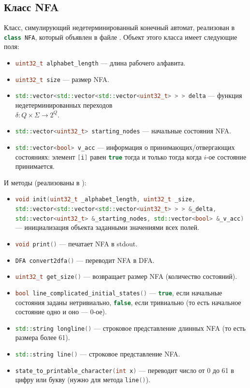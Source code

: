 \documentclass{article}
\begin{document}
\subsection{Класс NFA}
Класс, симулирующий недетерминированный конечный автомат, реализован в \lstinline[language=C++]!class NFA!, который объявлен в файле . Объект этого класса имеет следующие поля:
\begin{itemize}
  \item \lstinline[language=C++]!uint32_t alphabet_length! --- длина рабочего алфавита.
  \item \lstinline[language=C++]!uint32_t size! --- размер NFA.
  \item \lstinline[language=C++]!std::vector<std::vector<std::vector<uint32_t> > > delta! --- функция недетерминированных переходов\\ $\delta: Q \times \Sigma \rightarrow 2^Q$.
  \item \lstinline[language=C++]!std::vector<uint32_t> starting_nodes! --- начальные состояния NFA.
  \item \lstinline[language=C++]!std::vector<bool> v_acc! --- информация о принимающих/отвергающих состояниях: элемент \lstinline[language=C++]![i]! равен \lstinline[language=C++]!true! тогда и только тогда когда $i$-ое состояние принимается.
\end{itemize}
И методы (реализованы в ):
\begin{itemize}
  \item[\ding{228}] \lstinline[language=C++]!void init(uint32_t _alphabet_length, uint32_t _size, std::vector<std::vector<std::vector<uint32_t> > > &_delta, std::vector<uint32_t> &_starting_nodes, std::vector<bool> &_v_acc)! --- инициализация объекта заданными значениями всех полей.
  \item[\ding{228}] \lstinline[language=C++]!void print()! --- печатает NFA в stdout.
  \item[\ding{228}] \lstinline[language=C++]!DFA convert2dfa()! --- переводит NFA в DFA.
  \item[\ding{228}] \lstinline[language=C++]!uint32_t get_size()! --- возвращает размер NFA (количество состояний).
  \item[\ding{228}] \lstinline[language=C++]!bool line_complicated_initial_states()! --- \lstinline[language=C++]!true!, если начальные состояния заданы нетривиально, \lstinline[language=C++]!false!, если тривиально (то есть начальное состояние одно и оно --- 0-ое).
  \item[\ding{228}] \lstinline[language=C++]!std::string longline()! --- строковое представление длинных NFA (то есть размера более 61).
  \item[\ding{228}] \lstinline[language=C++]!std::string line()! --- строковое представление NFA.
  \item[\ding{228}] \lstinline[language=C++]!state_to_printable_character(int x)! --- переводит число от 0 до 61 в цифру или букву (нужно для метода \lstinline[language=C++]!line()!).
\end{itemize}
\hypertarget{p1}{}
\end{document}
